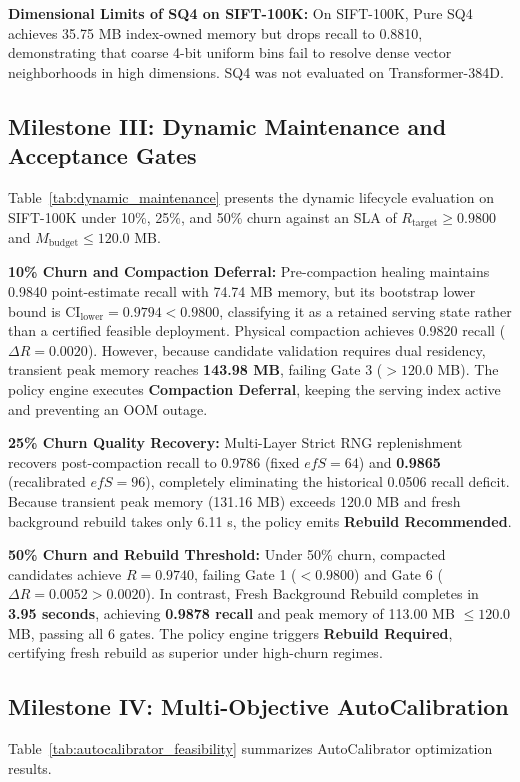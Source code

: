 \documentclass[10pt,journal,compsoc]{IEEEtran}
\begin{document}
\textbf{Dimensional Limits of SQ4 on SIFT-100K:} On SIFT-100K, Pure SQ4 achieves 35.75 MB index-owned memory but drops recall to 0.8810, demonstrating that coarse 4-bit uniform bins fail to resolve dense vector neighborhoods in high dimensions. SQ4 was not evaluated on Transformer-384D.



\subsection{Milestone III: Dynamic Maintenance and Acceptance Gates}
Table~\ref{tab:dynamic_maintenance} presents the dynamic lifecycle evaluation on SIFT-100K under 10\%, 25\%, and 50\% churn against an SLA of $R_{\text{target}} \ge 0.9800$ and $M_{\text{budget}} \le 120.0$ MB.

\textbf{10\% Churn and Compaction Deferral:} Pre-compaction healing maintains 0.9840 point-estimate recall with 74.74 MB memory, but its bootstrap lower bound is $\text{CI}_{\text{lower}} = 0.9794 < 0.9800$, classifying it as a retained serving state rather than a certified feasible deployment. Physical compaction achieves 0.9820 recall ($\Delta R = 0.0020$). However, because candidate validation requires dual residency, transient peak memory reaches \textbf{143.98 MB}, failing Gate 3 ($> 120.0$ MB). The policy engine executes \textbf{Compaction Deferral}, keeping the serving index active and preventing an OOM outage.

\textbf{25\% Churn Quality Recovery:} Multi-Layer Strict RNG replenishment recovers post-compaction recall to 0.9786 (fixed $efS=64$) and \textbf{0.9865} (recalibrated $efS=96$), completely eliminating the historical 0.0506 recall deficit. Because transient peak memory (131.16 MB) exceeds 120.0 MB and fresh background rebuild takes only 6.11 s, the policy emits \textbf{Rebuild Recommended}.

\textbf{50\% Churn and Rebuild Threshold:} Under 50\% churn, compacted candidates achieve $R=0.9740$, failing Gate 1 ($< 0.9800$) and Gate 6 ($\Delta R = 0.0052 > 0.0020$). In contrast, Fresh Background Rebuild completes in \textbf{3.95 seconds}, achieving \textbf{0.9878 recall} and peak memory of 113.00 MB $\le 120.0$ MB, passing all 6 gates. The policy engine triggers \textbf{Rebuild Required}, certifying fresh rebuild as superior under high-churn regimes.



\subsection{Milestone IV: Multi-Objective AutoCalibration}
Table~\ref{tab:autocalibrator_feasibility} summarizes AutoCalibrator optimization results.
\end{document}
